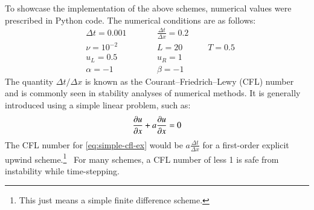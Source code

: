 To showcase the implementation of the above schemes, numerical values were prescribed in Python code.
The numerical conditions are as follows:
\begin{equation}
	\label{eq:numerical-conditions}
	\begin{alignedat}{3}
		&\Delta t = 0.001 \qquad &&\frac{\Delta t}{\Delta x} = 0.2 \\
		&\nu = 10^{-2} \qquad &&L = 20 \quad \qquad T = 0.5 \\
		&u_L = 0.5 \qquad &&u_R = 1 \\
		&\alpha = -1 \qquad &&\beta = -1
	\end{alignedat}
\end{equation}
The quantity $\Delta t / \Delta x$ is known as the Courant--Friedrich--Lewy (CFL) number and is commonly seen in stability analyses of numerical methods.
It is generally introduced using a simple linear problem, such as:
\begin{equation}
	\label{eq:simple-cfl-ex}
	\pdv{u}{x}+a\pdv{u}{x}=0
\end{equation}
The CFL number for \cref{eq:simple-cfl-ex} would be $a\frac{\Delta t}{\Delta x}$ for a first-order explicit upwind scheme.\footnote{This just means a simple finite difference scheme.}~\autocite{caminhaCFLConditionHow2017}
For many schemes, a CFL number of less 1 is safe from instability while time-stepping.

